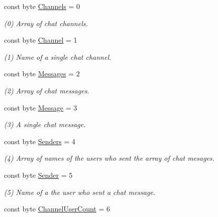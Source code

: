 \begin{DoxyCompactItemize}
\item 
const byte \hyperlink{class_exit_games_1_1_client_1_1_photon_1_1_chat_1_1_chat_parameter_code_a57a10f00289e58aff71bdabf7cf4f319}{Channels} = 0
\begin{DoxyCompactList}\small\item\em (0) Array of chat channels.\end{DoxyCompactList}\item 
const byte \hyperlink{class_exit_games_1_1_client_1_1_photon_1_1_chat_1_1_chat_parameter_code_a556f1d5a6cc2e8fb7dfb4f80fa39311b}{Channel} = 1
\begin{DoxyCompactList}\small\item\em (1) Name of a single chat channel.\end{DoxyCompactList}\item 
const byte \hyperlink{class_exit_games_1_1_client_1_1_photon_1_1_chat_1_1_chat_parameter_code_a3125fb72f9cff51b552d77abd26bdcfe}{Messages} = 2
\begin{DoxyCompactList}\small\item\em (2) Array of chat messages.\end{DoxyCompactList}\item 
const byte \hyperlink{class_exit_games_1_1_client_1_1_photon_1_1_chat_1_1_chat_parameter_code_ad5bc5de57ba8e78b5002e4a3c7b760ac}{Message} = 3
\begin{DoxyCompactList}\small\item\em (3) A single chat message.\end{DoxyCompactList}\item 
const byte \hyperlink{class_exit_games_1_1_client_1_1_photon_1_1_chat_1_1_chat_parameter_code_af53fe36e56bbddcc7595ef9145c232f0}{Senders} = 4
\begin{DoxyCompactList}\small\item\em (4) Array of names of the users who sent the array of chat mesages.\end{DoxyCompactList}\item 
const byte \hyperlink{class_exit_games_1_1_client_1_1_photon_1_1_chat_1_1_chat_parameter_code_a7e8317fba9446f840f9f76af1ed77a05}{Sender} = 5
\begin{DoxyCompactList}\small\item\em (5) Name of a the user who sent a chat message.\end{DoxyCompactList}\item 
const byte \hyperlink{class_exit_games_1_1_client_1_1_photon_1_1_chat_1_1_chat_parameter_code_a967db1960edbaaa9ee6de1cad924569b}{Channel\+User\+Count} = 6

\end{DoxyCompactItemize}
